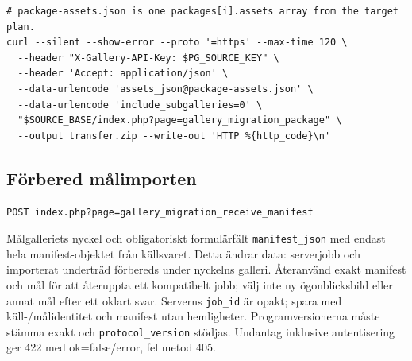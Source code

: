 \documentclass[11pt,a4paper]{article}
\newcommand{\codeword}[1]{\nolinkurl{#1}}
\begin{document}
\begin{lstlisting}[language={}]
# package-assets.json is one packages[i].assets array from the target plan.
curl --silent --show-error --proto '=https' --max-time 120 \
  --header "X-Gallery-API-Key: $PG_SOURCE_KEY" \
  --header 'Accept: application/json' \
  --data-urlencode 'assets_json@package-assets.json' \
  --data-urlencode 'include_subgalleries=0' \
  "$SOURCE_BASE/index.php?page=gallery_migration_package" \
  --output transfer.zip --write-out 'HTTP %{http_code}\n'
\end{lstlisting}

\subsection{\texorpdfstring{Förbered målimporten}{Förbered målimporten}}

\label{api352:migration-receive-manifest}

\begin{lstlisting}[language={}]
POST index.php?page=gallery_migration_receive_manifest
\end{lstlisting}

Målgalleriets nyckel och obligatoriskt formulärfält \codeword{manifest_json} med endast hela
manifest-objektet från källsvaret. Detta ändrar data: serverjobb och importerat underträd
förbereds under nyckelns galleri. Återanvänd exakt manifest och mål för att återuppta ett
kompatibelt jobb; välj inte ny ögonblicksbild eller annat mål efter ett oklart svar.
Serverns \codeword{job_id} är opakt; spara med käll-/målidentitet och manifest utan
hemligheter. Programversionerna måste stämma exakt och \codeword{protocol_version} stödjas.
Undantag inklusive autentisering ger 422 med ok=false/error, fel metod 405.
\end{document}
